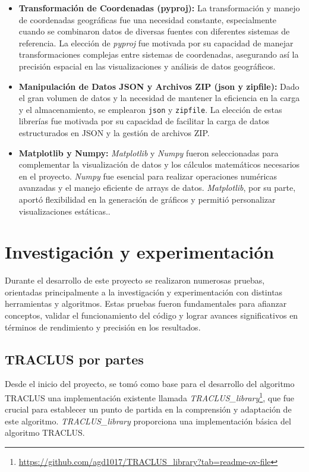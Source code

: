 \begin{itemize}
\begin{itemize}
        \item \textbf{Transformación de Coordenadas (pyproj):} La transformación y manejo de coordenadas geográficas fue una necesidad constante, especialmente cuando se combinaron datos de diversas fuentes con diferentes sistemas de referencia. La elección de \textit{pyproj} fue motivada por su capacidad de manejar transformaciones complejas entre sistemas de coordenadas, asegurando así la precisión espacial en las visualizaciones y análisis de datos geográficos.

        \item \textbf{Manipulación de Datos JSON y Archivos ZIP (json y zipfile):} Dado el gran volumen de datos y la necesidad de mantener la eficiencia en la carga y el almacenamiento, se emplearon \texttt{json} y \texttt{zipfile}. La elección de estas librerías fue motivada por su capacidad de facilitar la carga de datos estructurados en JSON y la gestión de archivos ZIP.

        \item \textbf{Matplotlib y Numpy:} \textit{Matplotlib} y \textit{Numpy} fueron seleccionadas para complementar la visualización de datos y los cálculos matemáticos necesarios en el proyecto. \textit{Numpy} fue esencial para realizar operaciones numéricas avanzadas y el manejo eficiente de arrays de datos. \textit{Matplotlib}, por su parte, aportó flexibilidad en la generación de gráficos y permitió personalizar visualizaciones estáticas..
    \end{itemize}
\end{itemize}

\section{Investigación y experimentación}

Durante el desarrollo de este proyecto se realizaron numerosas pruebas, orientadas principalmente a la investigación y experimentación con distintas herramientas y algoritmos. Estas pruebas fueron fundamentales para afianzar conceptos, validar el funcionamiento del código y lograr avances significativos en términos de rendimiento y precisión en los resultados.

\subsection{TRACLUS por partes}

Desde el inicio del proyecto, se tomó como base para el desarrollo del algoritmo TRACLUS una implementación existente llamada \textit{TRACLUS\_library}\footnote{\url{https://github.com/agd1017/TRACLUS_library?tab=readme-ov-file}}, que fue crucial para establecer un punto de partida en la comprensión y adaptación de este algoritmo. \textit{TRACLUS\_library} proporciona una implementación básica del algoritmo TRACLUS.

